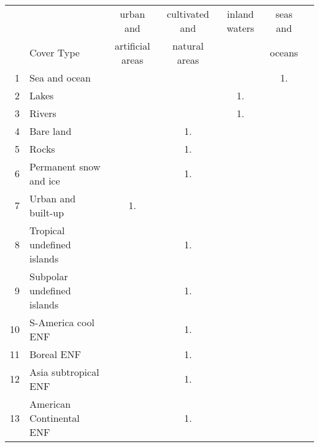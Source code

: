  \setlength{\textwidth}{18.0cm}
 \setlength{\textheight}{24.cm}
 \hoffset=-3.5cm
 
 {\footnotesize{
 \medskip\
 \begin{tabular}{||r|l||c|c|c|c|c||}
 \hline
 \hline
 && urban and & cultivated and &inland waters&seas and\\
 &Cover Type& artificial areas & natural areas&&oceans\\
 \hline
 \hline
           1  & Sea and ocean                                                &       &       &       &  1.   \\
 \hline
           2  & Lakes                                                        &       &       &  1.   &       \\
 \hline
           3  & Rivers                                                       &       &       &  1.   &       \\
 \hline
 \hline
           4  & Bare land                                                    &       &  1.   &       &       \\
 \hline
           5  & Rocks                                                        &       &  1.   &       &       \\
 \hline
           6  & Permanent snow and ice                                       &       &  1.   &       &       \\
 \hline
           7  & Urban and built-up                                           &  1.   &       &       &       \\
 \hline
 \hline
           8  & Tropical undefined islands                                   &       &  1.   &       &       \\
 \hline
           9  & Subpolar undefined islands                                   &       &  1.   &       &       \\
 \hline
 \hline
          10  & S-America cool ENF                                           &       &  1.   &       &       \\
 \hline
          11  & Boreal ENF                                                   &       &  1.   &       &       \\
 \hline
          12  & Asia subtropical ENF                                         &       &  1.   &       &       \\
 \hline
          13  & American Continental ENF                                     &       &  1.   &       &       \\

\end{tabular}}}
